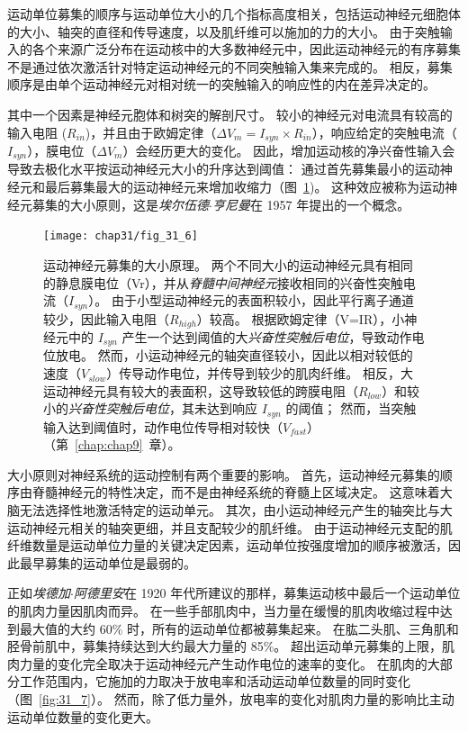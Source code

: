 运动单位募集的顺序与运动单位大小的几个指标高度相关，包括运动神经元细胞体的大小、轴突的直径和传导速度，以及肌纤维可以施加的力的大小。
由于突触输入的各个来源广泛分布在运动核中的大多数神经元中，因此运动神经元的有序募集不是通过依次激活针对特定运动神经元的不同突触输入集来完成的。
相反，募集顺序是由单个运动神经元对相对统一的突触输入的响应性的内在差异决定的。


其中一个因素是神经元胞体和树突的解剖尺寸。
较小的神经元对电流具有较高的输入电阻 ($ R_{in} $)，并且由于欧姆定律（$ \Delta V_m = I_{syn} \times R_{in} $），响应给定的突触电流（$ I_{syn} $），膜电位（$ \Delta V_m $）会经历更大的变化。
因此，增加运动核的净兴奋性输入会导致去极化水平按运动神经元大小的升序达到阈值：
通过首先募集最小的运动神经元和最后募集最大的运动神经元来增加收缩力（图~\ref{fig:31_6})。
这种效应被称为运动神经元募集的大小原则，这是\textit{埃尔伍德$\cdot$亨尼曼}在 1957 年提出的一个概念。


\begin{figure}[htbp]
	\centering
	\texttt{[image: chap31/fig\_31\_6]}
	\caption{运动神经元募集的大小原理。
	两个不同大小的运动神经元具有相同的静息膜电位（Vr），并从\textit{脊髓中间神经元}接收相同的兴奋性突触电流（$ I_{syn} $）。
	由于小型运动神经元的表面积较小，因此平行离子通道较少，因此输入电阻（$ R_{high} $）较高。
	根据欧姆定律（V=IR），小神经元中的 $ I_{syn} $ 产生一个达到阈值的大\textit{兴奋性突触后电位}，导致动作电位放电。
	然而，小运动神经元的轴突直径较小，因此以相对较低的速度（$ V_{slow} $）传导动作电位，并传导到较少的肌肉纤维。
	相反，大运动神经元具有较大的表面积，这导致较低的跨膜电阻（$R_{low}$）和较小的\textit{兴奋性突触后电位}，其未达到响应 $ I_{syn} $ 的阈值；
	然而，当突触输入达到阈值时，动作电位传导相对较快（$ V_{fast} $）（第~\ref{chap:chap9}~章）。}
	\label{fig:31_6}
\end{figure}


大小原则对神经系统的运动控制有两个重要的影响。
首先，运动神经元募集的顺序由脊髓神经元的特性决定，而不是由神经系统的脊髓上区域决定。
这意味着大脑无法选择性地激活特定的运动单元。
其次，由小运动神经元产生的轴突比与大运动神经元相关的轴突更细，并且支配较少的肌纤维。
由于运动神经元支配的肌纤维数量是运动单位力量的关键决定因素，运动单位按强度增加的顺序被激活，因此最早募集的运动单位是最弱的。


正如\textit{埃德加$\cdot$阿德里安}在 1920 年代所建议的那样，募集运动核中最后一个运动单位的肌肉力量因肌肉而异。
在一些手部肌肉中，当力量在缓慢的肌肉收缩过程中达到最大值的大约 60\% 时，所有的运动单位都被募集起来。
在肱二头肌、三角肌和胫骨前肌中，募集持续达到大约最大力量的 85\%。
超出运动单元募集的上限，肌肉力量的变化完全取决于运动神经元产生动作电位的速率的变化。
在肌肉的大部分工作范围内，它施加的力取决于放电率和活动运动单位数量的同时变化（图~\ref{fig:31_7}）。
然而，除了低力量外，放电率的变化对肌肉力量的影响比主动运动单位数量的变化更大。


